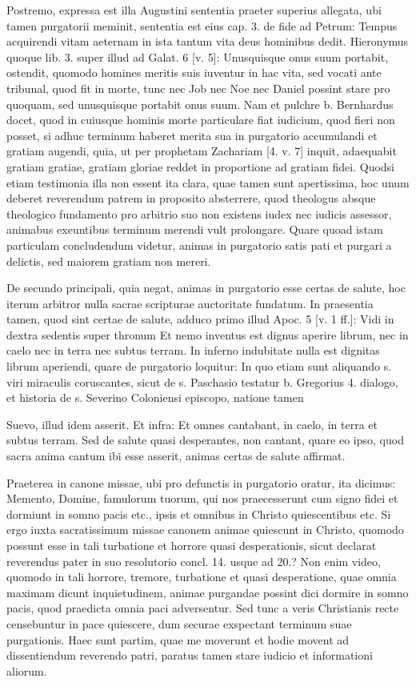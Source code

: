 Postremo, expressa est illa Augustini sententia praeter superius allegata, ubi tamen purgatorii meminit, sententia est eius cap. 3. de fide ad Petrum: Tempus acquirendi vitam aeternam in ista tantum vita deus hominibus dedit. Hieronymus quoque lib. 3. super illud ad Galat. 6 [v. 5]: Unusquisque onus suum portabit, ostendit, quomodo homines meritis suis iuventur in hac vita, sed vocati ante tribunal, quod fit in morte, tunc nec Job nec Noe nec Daniel possint stare pro quoquam, sed unusquisque portabit onus suum. Nam et pulchre b. Bernhardus docet, quod in cuiusque hominis morte particulare fiat iudicium, quod fieri non posset, si adhuc terminum haberet merita sua in purgatorio accumulandi et gratiam augendi, quia, ut per prophetam Zachariam [4. v. 7] inquit, adaequabit gratiam gratiae, gratiam gloriae reddet in proportione ad gratiam fidei. \marginpar{\small[328]} Quodsi etiam testimonia illa non essent ita clara, quae tamen sunt apertissima, hoc unum deberet reverendum patrem in proposito absterrere, quod theologus absque theologico fundamento pro arbitrio suo non existens iudex nec iudicis assessor, animabus exeuntibus terminum merendi vult prolongare. Quare quoad istam particulam concludendum videtur, animas in purgatorio satis pati et purgari a delictis, sed maiorem gratiam non mereri.

De secundo principali, quia negat, animas in purgatorio esse certas de salute, hoc iterum arbitror nulla sacrae scripturae auctoritate fundatum. In praesentia tamen, quod sint certae de salute, adduco primo illud Apoc. 5 [v. 1 ff.]: Vidi in dextra sedentis super thronum Et nemo inventus est dignus aperire librum, nec in caelo nec in terra nec subtus terram. In inferno indubitate nulla est dignitas librum aperiendi, quare de purgatorio loquitur: In quo etiam sunt aliquando s. viri miraculis coruscantes, sicut de s. Paschasio testatur b. Gregorius 4. dialogo, et historia de s. Severino Coloniensi episcopo, natione tamen

Suevo, illud idem asserit. Et infra: Et omnes cantabant, in caelo, in terra et subtus terram. Sed de salute quasi desperantes, non cantant, quare eo ipso, quod sacra anima cantum ibi esse asserit, animas certas de salute affirmat.

Praeterea in canone missae, ubi pro defunctis in purgatorio oratur, ita dicimus: Memento, Domine, famulorum tuorum, qui nos praecesserunt cum signo fidei et dormiunt in somno pacis etc., ipsis et omnibus in Christo quiescentibus etc. Si ergo iuxta sacratissimum missae canonem animae quiescunt in Christo, quomodo possunt esse in tali turbatione et horrore quasi desperationis, sicut declarat reverendus pater in suo resolutorio concl. 14. usque ad 20.? Non enim video, quomodo in tali horrore, tremore, turbatione et quasi desperatione, quae omnia maximam dicunt inquietudinem, animae purgandae possint dici dormire in somno pacis, quod praedicta omnia paci adversentur. Sed tunc a veris Christianis recte censebuntur in pace quiescere, dum securae exspectant terminum suae purgationis. Haec sunt partim, quae me moverunt et hodie movent ad dissentiendum reverendo patri, paratus tamen stare iudicio et informationi aliorum.

